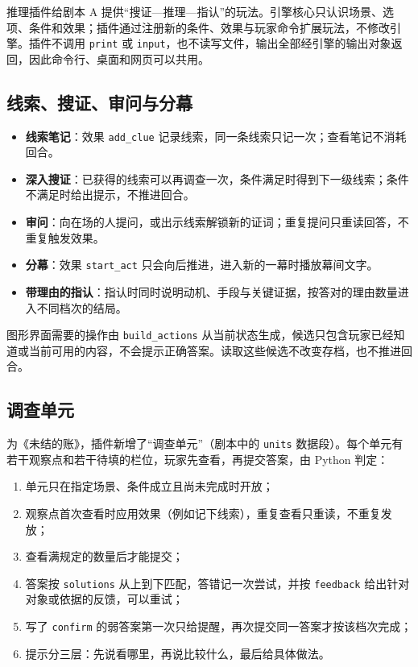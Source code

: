 \documentclass[11pt,a4paper,fontset=mac]{ctexart}
\begin{document}
推理插件给剧本 A 提供“搜证—推理—指认”的玩法。引擎核心只认识场景、选项、条件和效果；插件通过注册新的条件、效果与玩家命令扩展玩法，不修改引擎。插件不调用 \texttt{print} 或 \texttt{input}，也不读写文件，输出全部经引擎的输出对象返回，因此命令行、桌面和网页可以共用。

\subsection{线索、搜证、审问与分幕}

\begin{itemize}
  \item \textbf{线索笔记}：效果 \texttt{add\_clue} 记录线索，同一条线索只记一次；查看笔记不消耗回合。
  \item \textbf{深入搜证}：已获得的线索可以再调查一次，条件满足时得到下一级线索；条件不满足时给出提示，不推进回合。
  \item \textbf{审问}：向在场的人提问，或出示线索解锁新的证词；重复提问只重读回答，不重复触发效果。
  \item \textbf{分幕}：效果 \texttt{start\_act} 只会向后推进，进入新的一幕时播放幕间文字。
  \item \textbf{带理由的指认}：指认时同时说明动机、手段与关键证据，按答对的理由数量进入不同档次的结局。
\end{itemize}

图形界面需要的操作由 \texttt{build\_actions} 从当前状态生成，候选只包含玩家已经知道或当前可用的内容，不会提示正确答案。读取这些候选不改变存档，也不推进回合。

\subsection{调查单元}

为《未结的账》，插件新增了“调查单元”（剧本中的 \texttt{units} 数据段）。每个单元有若干观察点和若干待填的栏位，玩家先查看，再提交答案，由 Python 判定：

\begin{enumerate}
  \item 单元只在指定场景、条件成立且尚未完成时开放；
  \item 观察点首次查看时应用效果（例如记下线索），重复查看只重读，不重复发放；
  \item 查看满规定的数量后才能提交；
  \item 答案按 \texttt{solutions} 从上到下匹配，答错记一次尝试，并按 \texttt{feedback} 给出针对对象或依据的反馈，可以重试；
  \item 写了 \texttt{confirm} 的弱答案第一次只给提醒，再次提交同一答案才按该档次完成；
  \item 提示分三层：先说看哪里，再说比较什么，最后给具体做法。
\end{enumerate}
\end{document}
